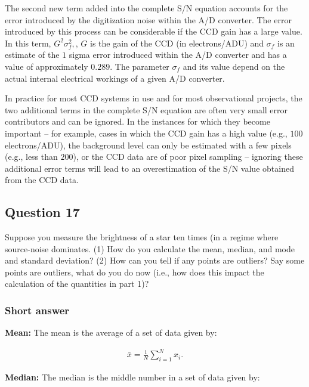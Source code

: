 \documentclass[a4paper,10pt]{article}
\begin{document}
{\noindent}The second new term added into the complete S/N equation accounts for the error introduced by the digitization noise within the A/D converter. The error introduced by this process can be considerable if the CCD gain has a large value. In this term, $G^2\sigma_f^2,$, $G$ is the gain of the CCD (in electrons/ADU) and $\sigma_f$ is an estimate of the $1$ sigma error introduced within the A/D converter and has a value of approximately $0.289$. The parameter $\sigma_f$ and its value depend on the actual internal electrical workings of a given A/D converter.

{\noindent}In practice for most CCD systems in use and for most observational projects, the two additional terms in the complete S/N equation are often very small error contributors and can be ignored. In the instances for which they become important -- for example, cases in which the CCD gain has a high value (e.g., $100$ electrons/ADU), the background level can only be estimated with a few pixels (e.g., less than $200$), or the CCD data are of poor pixel sampling -- ignoring these additional error terms will lead to an overestimation of the S/N value obtained from the CCD data.


\newpage
\subsection{Question 17}

Suppose you measure the brightness of a star ten times (in a regime where source-noise dominates. (1) How do you calculate the mean, median, and mode and standard deviation? (2) How can you tell if any points are outliers? Say some points are outliers, what do you do now (i.e., how does this impact the calculation of the quantities in part 1)?

\subsubsection{Short answer}

{\noindent}\textbf{Mean:} The mean is the average of a set of data given by:

\begin{align*}
\bar{x} = \frac{1}{N} \sum_{i=1}^N x_i.
\end{align*}

{\noindent}\textbf{Median:} The median is the middle number in a set of data given by:
\end{document}
